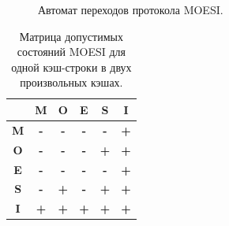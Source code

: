 \begin{figure}[ht]
  \centerfloat{
    
  }
  \caption{Автомат переходов протокола MOESI.}
  \label{fig:moesi-automate}
\end{figure}


\begin{table}[htbp]
  \caption{Матрица допустимых состояний MOESI для одной кэш-строки в двух
  произвольных кэшах.}
  \label{tab:moesi_matrix}
  \centering

  \renewcommand{\arraystretch}{1.5}
  \setlength{\tabcolsep}{8pt}

  \begin{tabular}{|c|c|c|c|c|c|}
    \hline
    \cellcolor{lightgray} & \cellcolor{lightgray}\textbf{M} &
    \cellcolor{lightgray}\textbf{O} & \cellcolor{lightgray}\textbf{E}
    & \cellcolor{lightgray}\textbf{S} & \cellcolor{lightgray}\textbf{I} \\
    \hline
    \cellcolor{lightgray}\textbf{M} &
    \textcolor{myred}{\textbf{\Large -}} &
    \textcolor{myred}{\textbf{\Large -}} &
    \textcolor{myred}{\textbf{\Large -}} &
    \textcolor{myred}{\textbf{\Large -}} &
    \textcolor{mygreen}{\textbf{\Large +}} \\
    \hline
    \cellcolor{lightgray}\textbf{O} &
    \textcolor{myred}{\textbf{\Large -}} &
    \textcolor{myred}{\textbf{\Large -}} &
    \textcolor{myred}{\textbf{\Large -}} &
    \textcolor{mygreen}{\textbf{\Large +}} &
    \textcolor{mygreen}{\textbf{\Large +}} \\
    \hline
    \cellcolor{lightgray}\textbf{E} &
    \textcolor{myred}{\textbf{\Large -}} &
    \textcolor{myred}{\textbf{\Large -}} &
    \textcolor{myred}{\textbf{\Large -}} &
    \textcolor{myred}{\textbf{\Large -}} &
    \textcolor{mygreen}{\textbf{\Large +}} \\
    \hline
    \cellcolor{lightgray}\textbf{S} &
    \textcolor{myred}{\textbf{\Large -}} &
    \textcolor{mygreen}{\textbf{\Large +}} &
    \textcolor{myred}{\textbf{\Large -}} &
    \textcolor{mygreen}{\textbf{\Large +}} &
    \textcolor{mygreen}{\textbf{\Large +}} \\
    \hline
    \cellcolor{lightgray}\textbf{I} &
    \textcolor{mygreen}{\textbf{\Large +}} &
    \textcolor{mygreen}{\textbf{\Large +}} &
    \textcolor{mygreen}{\textbf{\Large +}} &
    \textcolor{mygreen}{\textbf{\Large +}} &
    \textcolor{mygreen}{\textbf{\Large +}} \\
    \hline
  \end{tabular}
\end{table}

